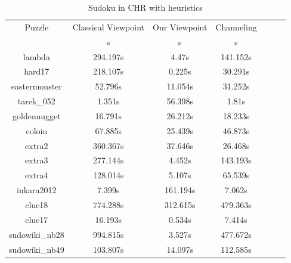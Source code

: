 \documentclass{report}
\begin{document}
\begin{table}[h!]
      \begin{tabular}{|c|c|c|c|c|c|c|}
        \hline
        \multirow{1}{*}{Puzzle} &
          \multicolumn{1}{L|}{Classical Viewpoint} &
          \multicolumn{1}{L|}{Our Viewpoint} &
          \multicolumn{1}{L|}{Channeling} \\
        & s & s & s \\
        \hline
lambda & 294.197s & 4.47s & 141.152s \\
hard17 & 218.107s & 0.225s & 30.291s \\
eastermonster & 52.796s & 11.054s & 31.252s \\
tarek\_052 & 1.351s & 56.398s & 1.81s \\
goldennugget & 16.791s & 26.212s & 18.233s \\
coloin & 67.885s & 25.439s & 46.873s \\
extra2 & 360.367s & 37.646s & 26.468s \\
extra3 & 277.144s & 4.452s & 143.193s \\
extra4 & 128.014s & 5.107s & 65.539s \\
inkara2012 & 7.399s & 161.194s & 7.062s \\
clue18 & 774.288s & 312.615s & 479.363s \\
clue17 & 16.193s & 0.534s & 7.414s \\
sudowiki\_nb28 & 994.815s & 3.527s & 477.672s \\
sudowiki\_nb49 & 103.807s & 14.097s & 112.585s \\
 \hline
      \end{tabular}
      \caption{Sudoku in CHR with heuristics}
    \end{table}
\end{document}
